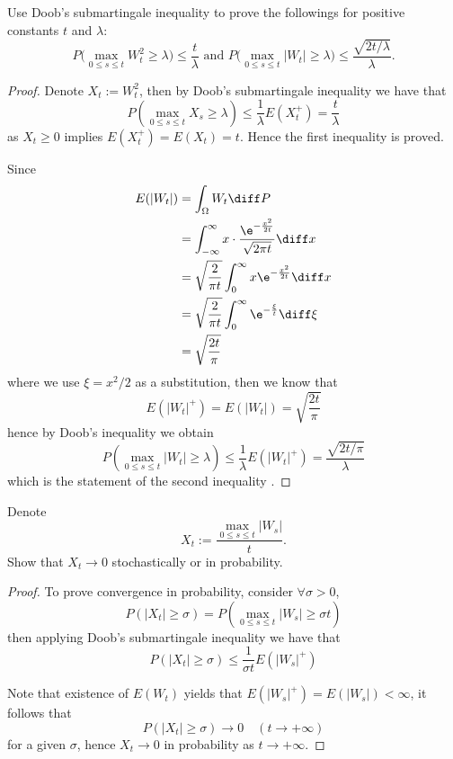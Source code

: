     \problem
    \begin{question}
        Use Doob's submartingale inequality to prove the followings
        for positive constants $t$ and $\lambda$:
        \[P\Big(\max_{0\leq s\leq t} W_t^2\geq \lambda\Big)
        \leq \frac{t}{\lambda}
        \text{~and~}P\Big(\max_{0\leq s\leq t} |W_t|\geq \lambda\Big)
        \leq \frac{\sqrt{2t/\lambda}}{\lambda}.\]
    \end{question}
    \begin{proof}
        Denote $X_t:=W_t^2$, then by Doob's submartingale inequality
        we have that
        \[P\left(\max_{0\leq s\leq t}X_s\geq\lambda\right)
        \leq\frac{1}{\lambda}E(X_t^+)=\frac{t}{\lambda}\]
        as $X_t\geq 0$ implies $E(X_t^+)=E(X_t)=t$. Hence the
        first inequality is proved.

        Since
        \[\begin{aligned}
            E(|W_t|)&=\int_{\Omega}W_t\diff P\\
            &=\int_{-\infty}^\infty x\cdot
              \frac{\e^{-\frac{x^2}{2t}}}{\sqrt{2\pi t}}
              \diff x\\
            &=\sqrt{\frac{2}{\pi t}}\int_0^\infty x\e^{-\frac{x^2}{2t}}\diff x\\
            &=\sqrt{\frac{2}{\pi t}}\int_0^\infty \e^{-\frac{\xi}{t}}\diff\xi\\
            &=\sqrt{\frac{2t}{\pi}}
        \end{aligned}\]
        where we use $\xi=x^2/2$ as a substitution,
        then we know that
        \[E(|W_t|^+)=E(|W_t|)=\sqrt{\frac{2t}{\pi}}\]
        hence by Doob's inequality we obtain
        \[P\left(\max_{0\leq s\leq t}|W_t|\geq\lambda\right)
        \leq\frac{1}{\lambda}E(|W_t|^+)=\frac{\sqrt{2t/\pi}}{\lambda}\]
        which is the statement of the second inequality
        .
    \end{proof}

    \problem
    \begin{question}
        Denote
        \[X_t:=\frac{\max_{0\leq s\leq t}|W_s|}{t}.\]
        Show that $X_t\rightarrow 0$ stochastically or in probability.
    \end{question}
    \begin{proof}
        To prove convergence in probability, consider
        $\forall\sigma>0$,
        \[P(|X_t|\geq\sigma)
        =P\left(\max_{0\leq s\leq t}|W_s|\geq\sigma t\right)\]
        then applying Doob's submartingale inequality we have that
        \[P(|X_t|\geq\sigma)\leq\frac{1}{\sigma t}E(|W_s|^+)\]

        Note that existence of $E(W_t)$ yields that
        $E(|W_s|^+)=E(|W_s|)<\infty$, it follows that
        \[P(|X_t|\geq\sigma)\to 0\quad (t\to +\infty)\]
        for a given $\sigma$, hence $X_t\to 0$ in probability
        as $t\to +\infty$.
    \end{proof}

